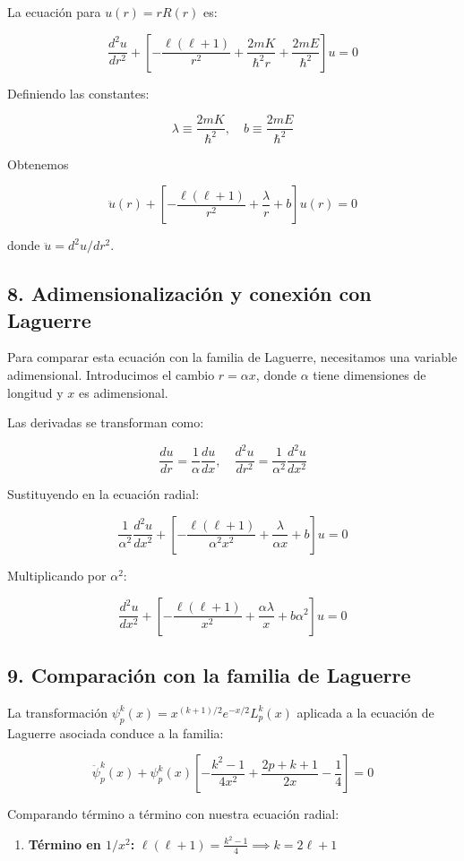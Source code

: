 \documentclass[a4paper]{article}
\begin{document}
La ecuación para $u(r) = rR(r)$ es:

\[
\frac{d^2u}{dr^2} + \left[-\frac{\ell(\ell+1)}{r^2} + \frac{2mK}{\hbar^2 r} + \frac{2mE}{\hbar^2}\right]u = 0
\]

Definiendo las constantes:

\[
\lambda \equiv \frac{2mK}{\hbar^2}, \quad b \equiv \frac{2mE}{\hbar^2}
\]

Obtenemos

\[
\boxed{\ddot{u}(r) + \left[-\frac{\ell(\ell+1)}{r^2} + \frac{\lambda}{r} + b\right]u(r) = 0}
\]

donde $\ddot{u} = d^2u/dr^2$.

\subsection{8. Adimensionalización y conexión con Laguerre}

Para comparar esta ecuación con la familia de Laguerre, necesitamos una variable adimensional. Introducimos el cambio $r = \alpha x$, donde $\alpha$ tiene dimensiones de longitud y $x$ es adimensional.

Las derivadas se transforman como:

\[
\frac{du}{dr} = \frac{1}{\alpha}\frac{du}{dx}, \quad \frac{d^2u}{dr^2} = \frac{1}{\alpha^2}\frac{d^2u}{dx^2}
\]

Sustituyendo en la ecuación radial:

\[
\frac{1}{\alpha^2}\frac{d^2u}{dx^2} + \left[-\frac{\ell(\ell+1)}{\alpha^2 x^2} + \frac{\lambda}{\alpha x} + b\right]u = 0
\]

Multiplicando por $\alpha^2$:

\[
\frac{d^2u}{dx^2} + \left[-\frac{\ell(\ell+1)}{x^2} + \frac{\alpha\lambda}{x} + b\alpha^2\right]u = 0
\]

\subsection{9. Comparación con la familia de Laguerre}

La transformación $\psi_p^k(x) = x^{(k+1)/2}e^{-x/2}L_p^k(x)$ aplicada a la ecuación de Laguerre asociada conduce a la familia:

\[
\ddot{\psi}_p^k(x) + \psi_p^k(x)\left[-\frac{k^2-1}{4x^2} + \frac{2p+k+1}{2x} - \frac{1}{4}\right] = 0
\]

Comparando término a término con nuestra ecuación radial:

\begin{enumerate}
\item \textbf{Término en $1/x^2$:} $\ell(\ell+1) = \frac{k^2-1}{4} \implies k = 2\ell+1$
\end{enumerate}
\end{document}
